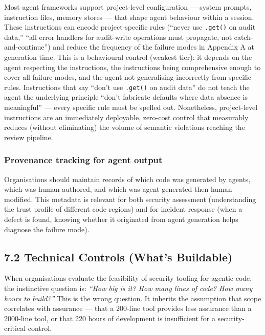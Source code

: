 \documentclass[a4paper,11pt]{report}
\begin{document}
Most agent frameworks support project-level configuration --- system
prompts, instruction files, memory stores --- that shape agent behaviour
within a session. These instructions can encode project-specific rules
(``never use \texttt{.get()} on audit data,'' ``all error handlers for
audit-write operations must propagate, not catch-and-continue'') and
reduce the frequency of the failure modes in Appendix A at generation
time. This is a behavioural control (weakest tier): it depends on the
agent respecting the instructions, the instructions being comprehensive
enough to cover all failure modes, and the agent not generalising
incorrectly from specific rules. Instructions that say ``don't use
\texttt{.get()} on audit data'' do not teach the agent the underlying
principle ``don't fabricate defaults where data absence is meaningful''
--- every specific rule must be spelled out. Nonetheless, project-level
instructions are an immediately deployable, zero-cost control that
measurably reduces (without eliminating) the volume of semantic
violations reaching the review pipeline.

\hypertarget{provenance-tracking-for-agent-output}{%
\subsubsection{Provenance tracking for agent
output}\label{provenance-tracking-for-agent-output}}

Organisations should maintain records of which code was generated by
agents, which was human-authored, and which was agent-generated then
human-modified. This metadata is relevant for both security assessment
(understanding the trust profile of different code regions) and for
incident response (when a defect is found, knowing whether it originated
from agent generation helps diagnose the failure mode).

\hypertarget{technical-controls-whats-buildable}{%
\subsection{7.2 Technical Controls (What's
Buildable)}\label{technical-controls-whats-buildable}}

When organisations evaluate the feasibility of security tooling for
agentic code, the instinctive question is: \emph{``How big is it? How
many lines of code? How many hours to build?''} This is the wrong
question. It inherits the assumption that scope correlates with
assurance --- that a 200-line tool provides less assurance than a
2000-line tool, or that 220 hours of development is insufficient for a
security-critical control.
\end{document}
